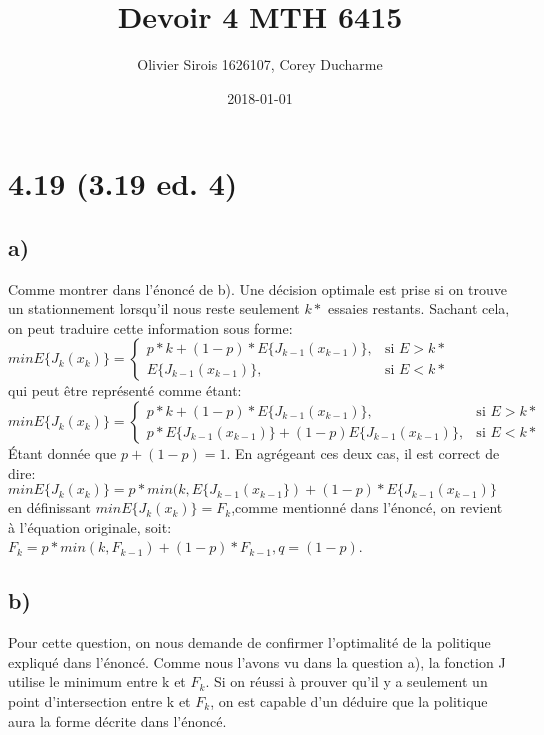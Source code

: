 \documentclass[oneside]{book}
\title{Devoir 4 MTH 6415}
\date{2018-01-01}
\author{Olivier Sirois 1626107, Corey Ducharme}
\begin{document}
\setcounter{page}{1}
\maketitle
\section*{4.19 (3.19 ed. 4)}
\subsection*{a)}
Comme montrer dans l'énoncé de b). Une décision optimale est prise si on trouve un stationnement lorsqu'il nous reste seulement $k*$ essaies restants. Sachant cela, on peut traduire cette information sous forme:\\


\begin{math}
min E \{ J_k(x_k) \} = 
\begin{cases}
p*k + (1-p)*E\{J_{k-1}(x_{k-1})\}, & \text{si } E > k*\\
E\{J_{k-1}(x_{k-1})\}, & \text{si } E < k*
\end{cases}
\end{math}\\


qui peut être représenté comme étant:\\

\begin{math}
min E \{ J_k(x_k) \} = 
\begin{cases}
p*k + (1-p)*E\{J_{k-1}(x_{k-1})\}, & \text{si } E > k*\\
p*E\{J_{k-1}(x_{k-1})\} + (1-p)E\{J_{k-1}(x_{k-1})\}, & \text{si } E < k*
\end{cases}
\end{math}\\

Étant donnée que $p + (1-p) = 1$. En agrégeant ces deux cas, il est correct de dire:\\

$min E \{ J_k(x_k) \} = p*min(k,E\{J_{k-1}(x_{k-1}\}) + (1-p)*E\{J_{k-1}(x_{k-1})\}$\\

en définissant $minE\{J_k(x_k)\} = F_k$,comme mentionné dans l'énoncé, on revient à l'équation originale, soit:\\

$F_k = p*min(k, F_{k-1}) + (1-p)*F_{k-1}, q = (1-p)$.

\subsection*{b)}
Pour cette question, on nous demande de confirmer l'optimalité de la politique expliqué dans l'énoncé. Comme nous l'avons vu dans la question a), la fonction J utilise le minimum entre k et $F_k$. Si on réussi à prouver qu'il y a seulement un point d'intersection entre k et $F_k$, on est capable d'un déduire que la politique aura la forme décrite dans l'énoncé. \\
\end{document}
